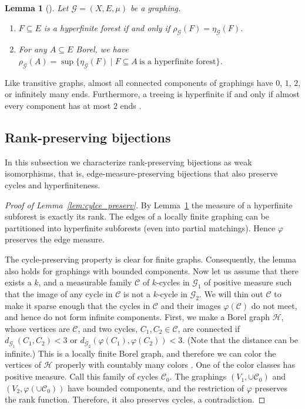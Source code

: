 \documentclass{article}
\theoremstyle{plain}
\newtheorem{lem}[thm]{Lemma}
\theoremstyle{definition}
\newcommand{\cG}{\mathcal{G}}
\newcommand{\cH}{\mathcal{H}}
\newcommand{\mC}{\mathscr C}
\begin{document}
\begin{lem}[\cite{berczi2026cycle}]\label{lem:hyperfinite_forest_rank}
    Let $\cG=(X, E , \mu)$ be a graphing.
    \begin{enumerate}
        \item $F\subseteq E$ is a hyperfinite forest if and only if $\rho_{\cG}(F) = \eta_{\cG}(F)$.
        \item For any $A\subseteq E$ Borel, we have $\rho_\cG(A)=\sup\{\eta_\cG(F)\mid F\subseteq A\ \text{is a hyperfinite forest}\}$.
    \end{enumerate}
\end{lem}

Like transitive graphs, almost all connected components of graphings have $0$, $1$, $2$, or infinitely many ends. Furthermore, a treeing is hyperfinite if and only if almost every component has at most $2$ ends \cite{Adams:trees_amenability}. 



\subsection{Rank-preserving bijections}
In this subsection we characterize rank-preserving bijections as weak isomorphisms, that is, edge-measure-preserving bijections that also preserve cycles and hyperfiniteness. 

\begin{proof}[Proof of Lemma~\ref{lem:cylce_preserv}]
    By Lemma~\ref{lem:hyperfinite_forest_rank} the measure of a hyperfinite subforest is exactly its rank. The edges of a locally finite graphing can be partitioned into hyperfinite subforests (even into partial matchings). Hence $\varphi$ preserves the edge measure.
    
    The cycle-preserving property is clear for finite graphs. Consequently, the lemma also holds for graphings with bounded components.
    Now let us assume that there exists a $k$, and a measurable family $\mC$ of $k$-cycles in $\cG_1$ of positive measure such that the image of any cycle in $\mC$ is not a $k$-cycle in $\cG_2$. We will thin out $\mC$ to make it sparse enough that the cycles in $\mC$ and their images $\varphi(\mC)$ do not meet, and hence do not form infinite components.
    First, we make a Borel graph $\cH$, whose vertices are $\mC$, and two cycles, $C_1,C_2\in \mC$, are connected if $d_{\cG_1}(C_1,C_2)<3$ or $d_{\cG_2}(\varphi(C_1),\varphi(C_2))<3$. (Note that the distance can be infinite.) 
    This is a locally finite Borel graph, and therefore we can color the vertices of $\cH$ properly with countably many colors \cite{kechris1999borel}. One of the color classes has positive measure. Call this family of cycles $\mC_0$. The graphings $(V_1,\cup\mC_0)$ and $(V_2,\varphi(\cup\mC_0))$ have bounded components, and the restriction of $\varphi$ preserves the rank function. Therefore, it also preserves cycles, a contradiction. 
\end{proof}
\end{document}
